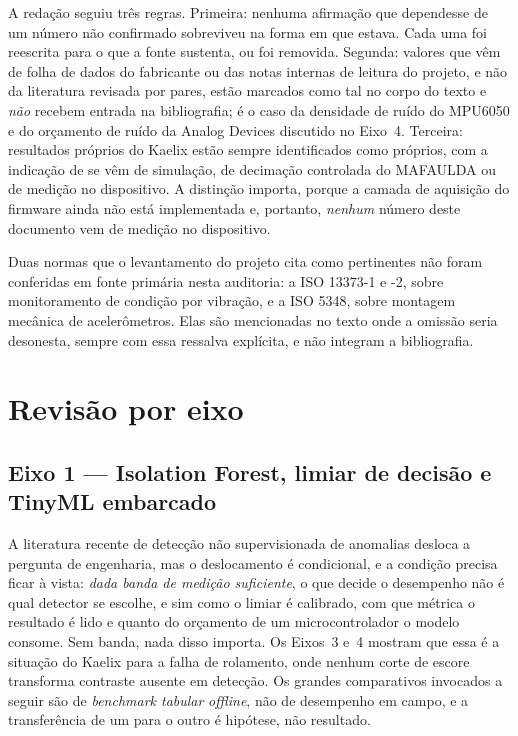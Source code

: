 \documentclass[11pt,a4paper]{article}
\begin{document}
A redação seguiu três regras. Primeira: nenhuma afirmação que dependesse de um número não
confirmado sobreviveu na forma em que estava. Cada uma foi reescrita para o que a fonte
sustenta, ou foi removida. Segunda: valores que vêm de folha de dados do fabricante
ou das notas internas de leitura do projeto, e não da literatura revisada por pares, estão
marcados como tal no corpo do texto e \emph{não} recebem entrada na bibliografia; é o caso
da densidade de ruído do MPU6050 e do orçamento de ruído da Analog Devices discutido no
Eixo~4. Terceira: resultados próprios do Kaelix estão sempre identificados como próprios,
com a indicação de se vêm de simulação, de decimação controlada do MAFAULDA ou de medição
no dispositivo. A distinção importa, porque a camada de aquisição do firmware ainda
não está implementada e, portanto, \emph{nenhum} número deste documento vem de medição no
dispositivo.

Duas normas que o levantamento do projeto cita como pertinentes não foram conferidas em
fonte primária nesta auditoria: a ISO 13373-1 e -2, sobre monitoramento de condição por
vibração, e a ISO 5348, sobre montagem mecânica de acelerômetros. Elas são mencionadas no
texto onde a omissão seria desonesta, sempre com essa ressalva explícita, e não integram a
bibliografia.

\section{Revisão por eixo}

\subsection{Eixo 1 --- Isolation Forest, limiar de decisão e TinyML embarcado}

A literatura recente de detecção não supervisionada de anomalias desloca a pergunta de
engenharia, mas o deslocamento é condicional, e a condição precisa ficar à vista:
\emph{dada banda de medição suficiente}, o que decide o desempenho não é qual detector se
escolhe, e sim como o limiar é calibrado, com que métrica o resultado é lido e quanto do
orçamento de um microcontrolador o modelo consome. Sem banda, nada disso importa. Os
Eixos~3 e~4 mostram que essa é a situação do Kaelix para a falha de rolamento,
onde nenhum corte de escore transforma contraste ausente em detecção. Os grandes
comparativos invocados a seguir são de \emph{benchmark tabular} \emph{offline}, não de
desempenho em campo, e a transferência de um para o outro é hipótese, não resultado.
\end{document}
